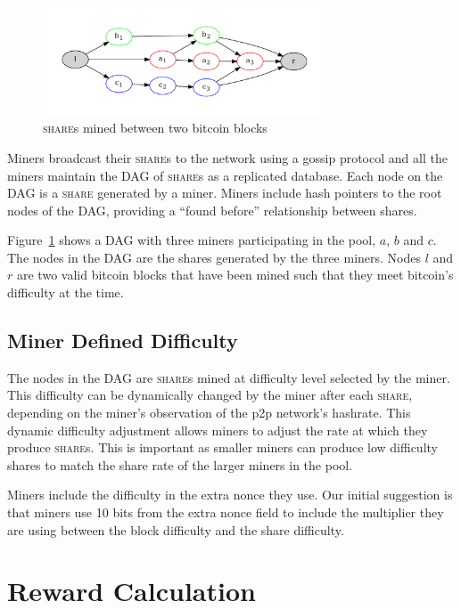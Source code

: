 \documentclass{article}
\begin{document}
\begin{figure}
  \begin{center}
    \includegraphics[width=0.75\textwidth]{dag}
    \caption{\textsc{share}s mined between two bitcoin blocks}\label{fig:dag}
  \end{center}
\end{figure}

Miners broadcast their \textsc{share}s to the network using a gossip
protocol and all the miners maintain the DAG of \textsc{share}s as a
replicated database. Each node on the DAG is a \textsc{share}
generated by a miner. Miners include hash pointers to the root nodes
of the DAG, providing a ``found before'' relationship between shares.

Figure~\ref{fig:dag} shows a DAG with three miners participating
in the pool, $a$, $b$ and $c$. The nodes in the DAG are the shares
generated by the three miners. Nodes $l$ and $r$ are two valid bitcoin
blocks that have been mined such that they meet bitcoin's difficulty
at the time.

\subsection{Miner Defined Difficulty}\label{sec:share-difficulty}

The nodes in the DAG are \textsc{share}s mined at difficulty level
selected by the miner. This difficulty can be dynamically changed by
the miner after each \textsc{share}, depending on the miner's
observation of the p2p network's hashrate. This dynamic difficulty
adjustment allows miners to adjust the rate at which they produce
\textsc{share}s. This is important as smaller miners can produce low
difficulty shares to match the share rate of the larger miners in the
pool.

Miners include the difficulty in the extra nonce they use. Our initial
suggestion is that miners use 10 bits from the extra nonce field to
include the multiplier they are using between the block difficulty and
the share difficulty. 

\section{Reward Calculation}\label{sec:rewards}
\end{document}
